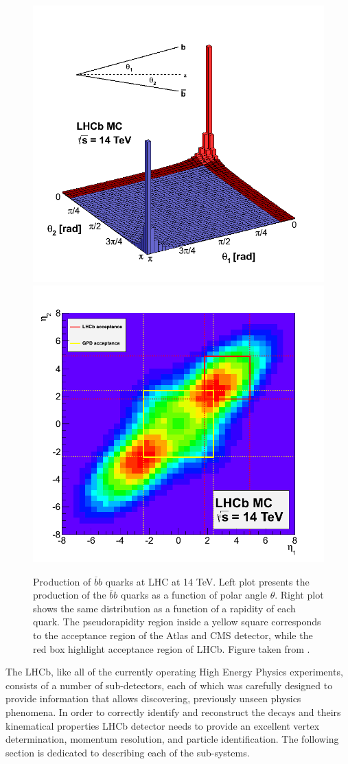 \begin{figure}[h]
 \begin{center}
  \includegraphics[width=0.48\linewidth]{figures/bb_2.png}
   \includegraphics[width=0.48\linewidth]{figures/bb_1.png}
   \caption{Production of  $\overline{b}b$ quarks at LHC at 14 TeV. Left plot presents the production of the $\overline{b}b$ quarks as a function of polar angle $\theta$. Right plot shows the same distribution as a function of a rapidity of each quark. The pseudorapidity region inside a yellow square corresponds to the acceptance region of the Atlas and CMS detector, while the red box highlight acceptance region of LHCb. Figure taken from \cite{bbangles}. 
     \label{fig:bb}}
 \end{center}
\end{figure}

The LHCb, like all of the currently operating High Energy Physics experiments, consists of a number of sub-detectors, each of which was carefully designed to provide information that allows discovering, previously unseen physics phenomena. In order to correctly identify and reconstruct the decays and theirs kinematical properties LHCb detector needs to provide an excellent vertex determination, momentum resolution, and particle identification. The following section is dedicated to describing each of the sub-systems. 


